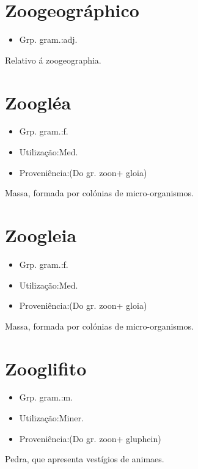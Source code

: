 \section{Zoogeográphico}
\begin{itemize}
\item {Grp. gram.:adj.}
\end{itemize}
Relativo á zoogeographia.
\section{Zoogléa}
\begin{itemize}
\item {Grp. gram.:f.}
\end{itemize}
\begin{itemize}
\item {Utilização:Med.}
\end{itemize}
\begin{itemize}
\item {Proveniência:(Do gr. \textunderscore zoon\textunderscore  + \textunderscore gloia\textunderscore )}
\end{itemize}
Massa, formada por colónias de micro-organismos.
\section{Zoogleia}
\begin{itemize}
\item {Grp. gram.:f.}
\end{itemize}
\begin{itemize}
\item {Utilização:Med.}
\end{itemize}
\begin{itemize}
\item {Proveniência:(Do gr. \textunderscore zoon\textunderscore  + \textunderscore gloia\textunderscore )}
\end{itemize}
Massa, formada por colónias de micro-organismos.
\section{Zooglifito}
\begin{itemize}
\item {Grp. gram.:m.}
\end{itemize}
\begin{itemize}
\item {Utilização:Miner.}
\end{itemize}
\begin{itemize}
\item {Proveniência:(Do gr. \textunderscore zoon\textunderscore  + \textunderscore gluphein\textunderscore )}
\end{itemize}
Pedra, que apresenta vestígios de animaes.
